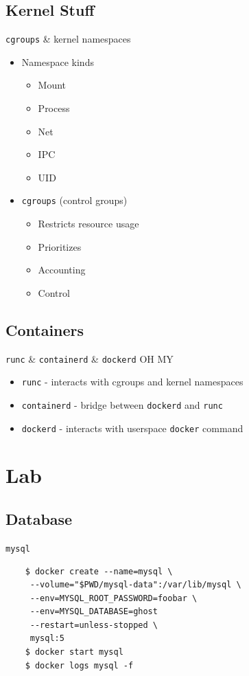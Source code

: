 \documentclass{beamer}
\begin{document}
\subsection{Kernel Stuff}

\begin{frame}{\texttt{cgroups} \& kernel namespaces}
\begin{itemize}
    \item Namespace kinds
    \begin{itemize}
        \item Mount
        \item Process
        \item Net
        \item IPC
        \item UID
    \end{itemize}
    \item \texttt{cgroups} (control groups)
    \begin{itemize}
        \item Restricts resource usage
        \item Prioritizes
        \item Accounting
        \item Control
    \end{itemize}
\end{itemize}
\end{frame}

\subsection{Containers}

\begin{frame}{\texttt{runc} \& \texttt{containerd} \& \texttt{dockerd} OH MY}
\begin{itemize}
    \item \texttt{runc} - interacts with cgroups and kernel namespaces
    \item \texttt{containerd} - bridge between \texttt{dockerd} and \texttt{runc}
    \item \texttt{dockerd} - interacts with userspace \texttt{docker} command
\end{itemize}
\end{frame}

\section{Lab}
\subsection{Database}
\begin{frame}[fragile]{\texttt{mysql}}
    \begin{lstlisting}
    $ docker create --name=mysql \
     --volume="$PWD/mysql-data":/var/lib/mysql \
     --env=MYSQL_ROOT_PASSWORD=foobar \
     --env=MYSQL_DATABASE=ghost
     --restart=unless-stopped \
     mysql:5
    $ docker start mysql
    $ docker logs mysql -f
    \end{lstlisting}
\end{frame}
\end{document}
